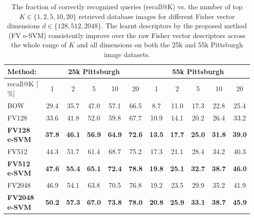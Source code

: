 \documentclass[10pt,twocolumn,letterpaper]{article}
\begin{document}
         \begin{table}[t!]
            \begin{centering}
               \begin{tabularx}{0.75\linewidth}{|l|c c c c c|c c c c c|}
                  \hline 
                  \rowcolor{maroon!50}
                  Method: & \multicolumn{5}{c|}{25k Pittsburgh} & \multicolumn{5}{c|}{55k Pittsburgh} \\
                  \hline 
                  \hline 
                  \rowcolor{maroon!50}
                  recall@K [$\%$] & 1 & 2 & 5 & 10 & 20 & 1 & 2 & 5 & 10 & 20\\
                  \hline
                  \rowcolor{maroon!10}
                  BOW & 29.4 & 35.7 & 47.0 & 57.1 & 66.5 & 8.7 & 11.0 & 17.3 & 22.8 & 25.4  \\
                    \hline
                  \rowcolor{maroon!10}
                  FV128         & 33.6 & 41.8 & 52.0 & 59.8 & 67.7 & 10.9 & 14.1 & 20.2 & 26.4 & 33.2 \\
                  \rowcolor{maroon!10}
                  \textbf{FV128 e-SVM}   & \textbf{37.8}  & \textbf{46.1} & \textbf{56.9} & \textbf{64.9} & \textbf{72.6}  &
                                             \textbf{13.5}  &  \textbf{17.7}  &  \textbf{25.0}  &  \textbf{31.8}  &  \textbf{39.0} \\
                    \hline
                    \rowcolor{maroon!10}
                    FV512         & 44.3 & 51.7 & 61.4 & 68.7 & 75.2 & 17.3 &  21.1 &  28.4 &  34.2 &  40.3 \\
                    \rowcolor{maroon!10}
                    \textbf{FV512 e-SVM}   & \textbf{47.6}  & \textbf{55.4} & \textbf{65.1} & \textbf{72.4} & \textbf{78.8}  &
                                             \textbf{19.8} &  \textbf{25.1} &  \textbf{32.7}  & \textbf{38.7} &  \textbf{46.0} \\
                    \hline
                  \rowcolor{maroon!10}
                  FV2048        & 46.9  & 54.1 & 63.8 & 70.5 & 76.8 & 19.2 & 23.5 & 29.9 &  35.2 &  41.9 \\
                  \rowcolor{maroon!10}
                  \textbf{FV2048 e-SVM}  & \textbf{50.2} & \textbf{57.3} & \textbf{67.0} & \textbf{73.8} & \textbf{78.0} &
                    \textbf{20.8} & \textbf{25.9} & \textbf{33.1} & \textbf{38.7} & \textbf{45.9}\\
                  \hline
               \end{tabularx}
            \caption{ \textcolor{myRed}{}
                  The fraction of correctly recognized queries (recall@K) vs. the number of top $K\in\{1,2,5,10,20\}$ retrieved database images for different Fisher vector dimensions $d\in\{128,512,2048\}$. The learnt descriptors by the proposed method (FV e-SVM) consistently improve over the raw Fisher vector descriptors across the whole range of $K$  and all dimensions on both the 25k and 55k Pittsburgh image datasets.     
            }
            \label{tab:recall}
            \end{centering}
         \end{table}
\end{document}
